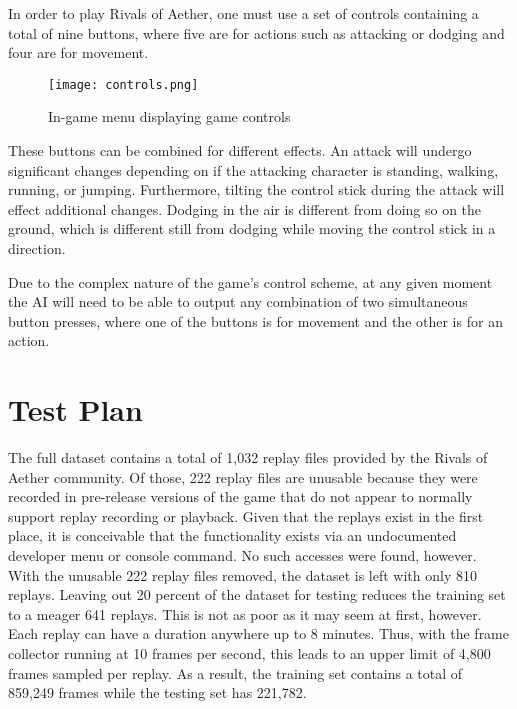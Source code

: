 In order to play Rivals of Aether, one must use a set of controls containing a total of nine buttons, where five are for actions such as attacking or dodging and four are for movement.

\begin{figure}
	\caption{In-game menu displaying game controls}
	\centering
	\texttt{[image: controls.png]} \\
\end{figure}

These buttons can be combined for different effects. An attack will undergo significant changes depending on if the attacking character is standing, walking, running, or jumping. Furthermore, tilting the control stick during the attack will effect additional changes. Dodging in the air is different from doing so on the ground, which is different still from dodging while moving the control stick in a direction.

Due to the complex nature of the game's control scheme, at any given moment the AI will need to be able to output any combination of two simultaneous button presses, where one of the buttons is for movement and the other is for an action.




\section{Test Plan}

The full dataset contains a total of 1,032 replay files provided by the Rivals of Aether community. Of those, 222 replay files are unusable because they were recorded in pre-release versions of the game that do not appear to normally support replay recording or playback. Given that the replays exist in the first place, it is conceivable that the functionality exists via an undocumented developer menu or console command. No such accesses were found, however. With the unusable 222 replay files removed, the dataset is left with only 810 replays. Leaving out 20 percent of the dataset for testing reduces the training set to a meager 641 replays. This is not as poor as it may seem at first, however. Each replay can have a duration anywhere up to 8 minutes. Thus, with the frame collector running at 10 frames per second, this leads to an upper limit of 4,800 frames sampled per replay. As a result, the training set contains a total of 859,249 frames while the testing set has 221,782.

